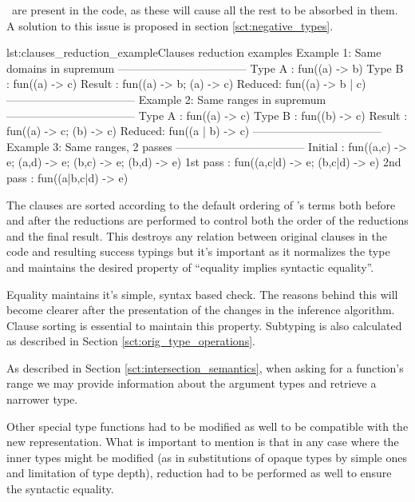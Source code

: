\begin{description}
\begin{enumerate}
      \any\ are present in the code, as these will cause all the rest
      to be absorbed in them. A solution to this issue is proposed in section
      \ref{sct:negative_types}.
      \begin{console}{lst:clauses_reduction_example}{Clauses reduction examples}
        Example 1: Same domains in supremum
        -----------------------------------
        Type A : fun((a) -> b)
        Type B : fun((a) -> c)
        Result : fun((a) -> b; (a) -> c)
        Reduced: fun((a) -> b | c)
        -----------------------------------
        Example 2: Same ranges in supremum
        -----------------------------------
        Type A : fun((a) -> c)
        Type B : fun((b) -> c)
        Result : fun((a) -> c; (b) -> c)
        Reduced: fun((a | b) -> c)
        -----------------------------------
        Example 3: Same ranges, 2 passes
        -----------------------------------
        Initial  : fun((a,c) -> e; (a,d) -> e; (b,c) -> e; (b,d) -> e)
        1st pass : fun((a,c|d) -> e; (b,c|d) -> e)
        2nd pass : fun((a|b,c|d) -> e)

      \end{console}
  \end{enumerate}
\item[Sorting of clauses:] The clauses are sorted according to the
  default ordering of \er's terms both before and after the reductions
  are performed to control both the order of the reductions and the
  final result. This destroys any relation between original clauses in
  the code and resulting success typings but it's important as it
  normalizes the type and maintains the desired property of ``equality
  implies syntactic equality''.
\item[Equality and subtyping:] Equality maintains it's simple, syntax
  based check. The reasons behind this will become clearer after the
  presentation of the changes in the inference algorithm. Clause
  sorting is essential to maintain this property. Subtyping is also
  calculated as described in Section \ref{sct:orig_type_operations}.
\item[Function range:] As described in Section
  \ref{sct:intersection_semantics}, when asking for a function's range
  we may provide information about the argument types and retrieve a
  narrower type.
\end{description}

Other special type functions had to be modified as well to be
compatible with the new representation. What is important to mention
is that in any case where the inner types might be modified (as in
substitutions of opaque types by simple ones and limitation of type
depth), reduction had to be performed as well to ensure the syntactic
equality.

